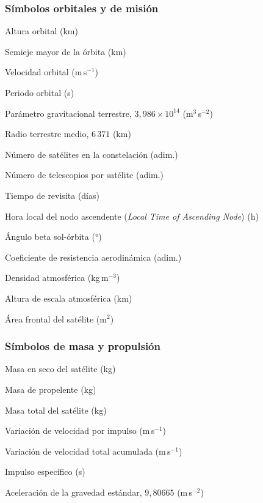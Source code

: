 \subsubsection*{Símbolos orbitales y de misión}
\begin{description}[leftmargin=4.5cm, labelwidth=4cm, labelsep=0.5cm]
  \item[$h$]                Altura orbital (km)
  \item[$a$]                Semieje mayor de la órbita (km)
  \item[$v_\text{orb}$]     Velocidad orbital (m\,s$^{-1}$)
  \item[$T_\text{orb}$]     Periodo orbital (s)
  \item[$\mu$]              Parámetro gravitacional terrestre, $3{,}986\times10^{14}$ (m$^3$\,s$^{-2}$)
  \item[$R_T$]              Radio terrestre medio, $6\,371$ (km)
  \item[$N_\text{sat}$]     Número de satélites en la constelación (adim.)
  \item[$N_\text{tel}$]     Número de telescopios por satélite (adim.)
  \item[$T_\text{rev}$]     Tiempo de revisita (días)
  \item[LTAN]               Hora local del nodo ascendente (\textit{Local Time of Ascending Node}) (h)
  \item[$\beta$]            Ángulo beta sol-órbita (°)
  \item[$C_d$]              Coeficiente de resistencia aerodinámica (adim.)
  \item[$\rho$]             Densidad atmosférica (kg\,m$^{-3}$)
  \item[$H_\text{atm}$]     Altura de escala atmosférica (km)
  \item[$A$]                Área frontal del satélite (m$^2$)
\end{description}

\subsubsection*{Símbolos de masa y propulsión}
\begin{description}[leftmargin=4.5cm, labelwidth=4cm, labelsep=0.5cm]
  \item[$m_\text{seca}$]    Masa en seco del satélite (kg)
  \item[$m_\text{prop}$]    Masa de propelente (kg)
  \item[$m_\text{total}$]   Masa total del satélite (kg)
  \item[$\Delta v$]         Variación de velocidad por impulso (m\,s$^{-1}$)
  \item[$\Delta v_\text{tot}$] Variación de velocidad total acumulada (m\,s$^{-1}$)
  \item[$I_{sp}$]           Impulso específico (s)
  \item[$g_0$]              Aceleración de la gravedad estándar, $9{,}80665$ (m\,s$^{-2}$)
\end{description}


